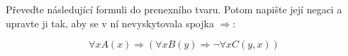 \subsubsection{}
Převeďte následující formuli do prenexního tvaru. Potom napište její negaci a
upravte ji tak, aby se v ní nevyskytovala spojka $\Rightarrow$:

$$\forall x A(x) \Rightarrow (\forall x B(y) \Rightarrow \neg \forall x
C(y,x))$$

